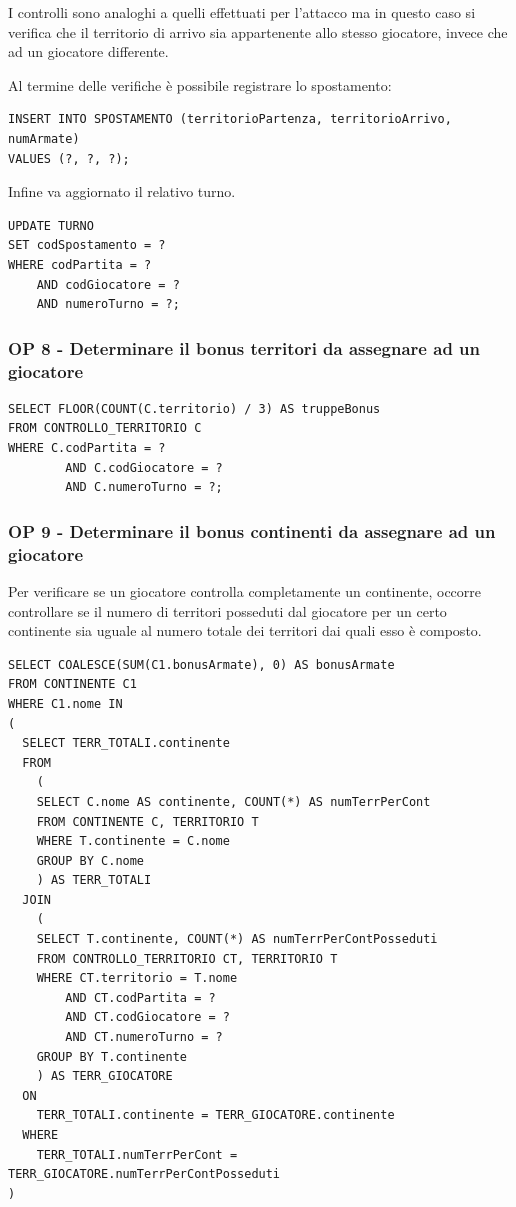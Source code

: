 \documentclass[a4paper,12pt]{report}
\begin{document}
I controlli sono analoghi a quelli effettuati per l'attacco ma in questo caso si verifica che il territorio di arrivo sia
appartenente allo stesso giocatore, invece che ad un giocatore differente.

Al termine delle verifiche è possibile registrare lo spostamento:
\begin{verbatim}
INSERT INTO SPOSTAMENTO (territorioPartenza, territorioArrivo, numArmate) 
VALUES (?, ?, ?);
\end{verbatim}
Infine va aggiornato il relativo turno.
\begin{verbatim}
UPDATE TURNO 
SET codSpostamento = ?
WHERE codPartita = ? 
    AND codGiocatore = ? 
    AND numeroTurno = ?;
\end{verbatim}

\subsubsection{OP 8 - Determinare il bonus territori da assegnare ad un giocatore}

\begin{verbatim}
SELECT FLOOR(COUNT(C.territorio) / 3) AS truppeBonus
FROM CONTROLLO_TERRITORIO C
WHERE C.codPartita = ?
        AND C.codGiocatore = ?
        AND C.numeroTurno = ?;
\end{verbatim}

\subsubsection{OP 9 - Determinare il bonus continenti da assegnare ad un giocatore}

Per verificare se un giocatore controlla completamente un continente, occorre controllare se il numero di territori posseduti 
dal giocatore per un certo continente sia uguale al numero totale dei territori dai quali esso è composto.

\begin{verbatim}
SELECT COALESCE(SUM(C1.bonusArmate), 0) AS bonusArmate
FROM CONTINENTE C1
WHERE C1.nome IN
(
  SELECT TERR_TOTALI.continente
  FROM 
    (
    SELECT C.nome AS continente, COUNT(*) AS numTerrPerCont
    FROM CONTINENTE C, TERRITORIO T 
    WHERE T.continente = C.nome 
    GROUP BY C.nome
    ) AS TERR_TOTALI
  JOIN 
    (
    SELECT T.continente, COUNT(*) AS numTerrPerContPosseduti 
    FROM CONTROLLO_TERRITORIO CT, TERRITORIO T 
    WHERE CT.territorio = T.nome 
        AND CT.codPartita = ? 
        AND CT.codGiocatore = ? 
        AND CT.numeroTurno = ?
    GROUP BY T.continente
    ) AS TERR_GIOCATORE 
  ON 
    TERR_TOTALI.continente = TERR_GIOCATORE.continente
  WHERE 
    TERR_TOTALI.numTerrPerCont = TERR_GIOCATORE.numTerrPerContPosseduti
)
\end{verbatim}
\end{document}
